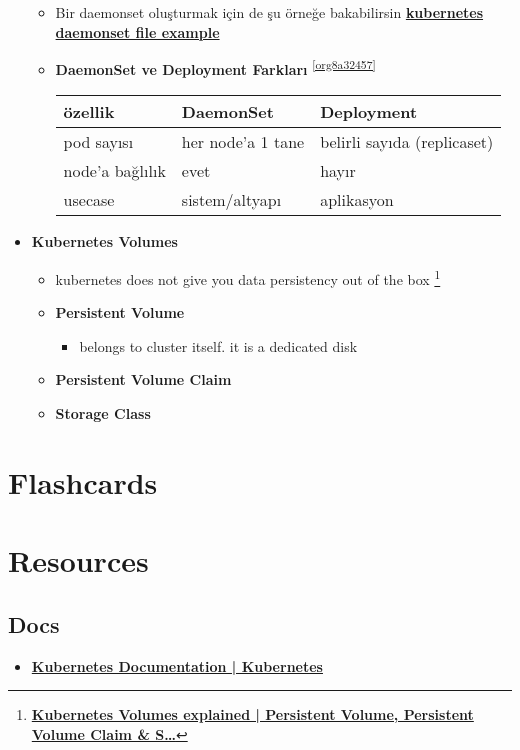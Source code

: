 \documentclass[14pt]{article}
\let\oldhref\href
\renewcommand{\href}[2]{\oldhref{#1}{\textbf{#2}}}
\begin{document}
\begin{itemize}
\begin{itemize}
\item Bir daemonset oluşturmak için de şu örneğe bakabilirsin \href{daily/2025-09-10.org}{kubernetes daemonset file example}
\item \textbf{DaemonSet ve Deployment Farkları} \textsuperscript{\ref{org8a32457}}
\begin{center}
\begin{tabular}{lll}
özellik & DaemonSet & Deployment\\
\hline
pod sayısı & her node'a 1 tane & belirli sayıda (replicaset)\\
node'a bağlılık & evet & hayır\\
usecase & sistem/altyapı & aplikasyon\\
\end{tabular}
\end{center}
\end{itemize}
\item \textbf{Kubernetes Volumes}
\begin{itemize}
\item kubernetes does not give you data persistency out of the box \footnote{\href{https://www.youtube.com/watch?v=0swOh5C3OVM}{Kubernetes Volumes explained | Persistent Volume, Persistent Volume Claim \& S\ldots{}}}
\item \textbf{Persistent Volume}
\begin{itemize}
\item belongs to cluster itself. it is a dedicated disk
\end{itemize}
\item \textbf{Persistent Volume Claim}
\item \textbf{Storage Class}
\end{itemize}
\end{itemize}
\section*{Flashcards}
\label{sec:orgee62499}
\section*{Resources}
\label{sec:org148f22a}
\subsection*{Docs}
\label{sec:org6d7667b}
\begin{itemize}
\item \href{https://kubernetes.io/docs/home/}{Kubernetes Documentation | Kubernetes}
\end{itemize}
\end{document}
